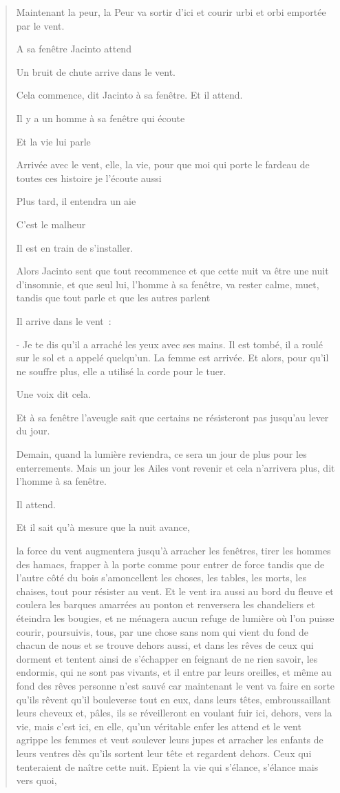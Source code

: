 \begin{quote}
Maintenant la peur, la Peur va sortir d'ici et courir urbi et orbi
emportée par le vent.

A sa fenêtre Jacinto attend

Un bruit de chute arrive dans le vent.

Cela commence, dit Jacinto à sa fenêtre. Et il attend.

Il y a un homme à sa fenêtre qui écoute

Et la vie lui parle

Arrivée avec le vent, elle, la vie, pour que moi qui porte le fardeau de
toutes ces histoire je l'écoute aussi

Plus tard, il entendra un aie

C'est le malheur

Il est en train de s'installer.

Alors Jacinto sent que tout recommence et que cette nuit va être une
nuit d'insomnie, et que seul lui, l'homme à sa fenêtre, va rester calme,
muet, tandis que tout parle et que les autres parlent

Il arrive dans le vent~:

- Je te dis qu'il a arraché les yeux avec ses mains. Il est tombé, il a
roulé sur le sol et a appelé quelqu'un. La femme est arrivée. Et alors,
pour qu'il ne souffre plus, elle a utilisé la corde pour le tuer.

Une voix dit cela.

Et à sa fenêtre l'aveugle sait que certains ne résisteront pas jusqu'au
lever du jour.

Demain, quand la lumière reviendra, ce sera un jour de plus pour les
enterrements. Mais un jour les Ailes vont revenir et cela n'arrivera
plus, dit l'homme à sa fenêtre.

Il attend.

Et il sait qu'à mesure que la nuit avance,

la force du vent augmentera jusqu'à arracher les fenêtres, tirer les
hommes des hamacs, frapper à la porte comme pour entrer de force tandis
que de l'autre côté du bois s'amoncellent les choses, les tables, les
morts, les chaises, tout pour résister au vent. Et le vent ira aussi au
bord du fleuve et coulera les barques amarrées au ponton et renversera
les chandeliers et éteindra les bougies, et ne ménagera aucun refuge de
lumière où l'on puisse courir, poursuivis, tous, par une chose sans nom
qui vient du fond de chacun de nous et se trouve dehors aussi, et dans
les rêves de ceux qui dorment et tentent ainsi de s'échapper en feignant
de ne rien savoir, les endormis, qui ne sont pas vivants, et il entre
par leurs oreilles, et même au fond des rêves personne n'est sauvé car
maintenant le vent va faire en sorte qu'ils rêvent qu'il bouleverse tout
en eux, dans leurs têtes, embroussaillant leurs cheveux et, pâles, ils
se réveilleront en voulant fuir ici, dehors, vers la vie, mais c'est
ici, en elle, qu'un véritable enfer les attend et le vent agrippe les
femmes et veut soulever leurs jupes et arracher les enfants de leurs
ventres dès qu'ils sortent leur tête et regardent dehors. Ceux qui
tenteraient de naître cette nuit. Epient la vie qui s'élance, s'élance
mais vers quoi,


\end{quote}
